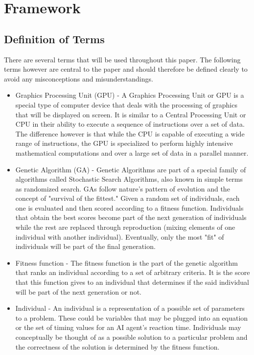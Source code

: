 \chapter{Framework}

\section{Definition of Terms}

There are several terms that will be used throughout this paper.
The following terms however are central to the paper and should therefore be defined clearly
to avoid any misconceptions and misunderstandings.

\begin{itemize}
 \item Graphics Processing Unit (GPU) -  A Graphics Processing Unit or GPU is a special type
of computer device that deals with the processing of graphics that will be displayed
on screen. It is similar to a Central Processing Unit or CPU in their ability to execute
a sequence of instructions over a set of data. The difference however is that while the
CPU is capable of executing a wide range of instructions, the GPU is specialized to perform
highly intensive mathematical computations and over a large set of data in a parallel manner.

 \item Genetic Algorithm (GA) - Genetic Algorithms are part of a special family of algorithms
called Stochastic Search Algorithms, also known in simple terms as randomized search. GAs
follow nature's pattern of evolution and the concept of "survival of the fittest." Given
a random set of individuals, each one is evaluated and then scored according to a fitness function.
Individuals that obtain the best scores become part of the next generation of individuals while the
rest are replaced through reproduction (mixing elements of one individual with another individual).
Eventually, only the most "fit" of individuals will be part of the final generation.

 \item Fitness function - The fitness function is the part of the genetic algorithm that ranks
an individual according to a set of arbitrary criteria. It is the score that this function
gives to an individual that determines if the said individual will be part of the next generation
or not.

 \item Individual - An individual is a representation of a possible set of parameters to a problem.
These could be variables that may be plugged into an equation or the set of timing values for an
AI agent's reaction time. Individuals may conceptually be thought of as a possible solution to a
particular problem and the correctness of the solution is determined by the fitness function.


\end{itemize}

